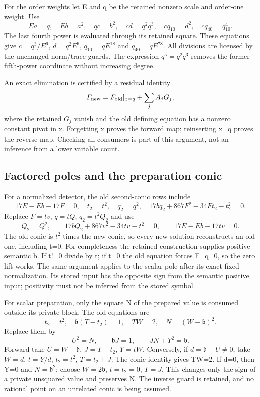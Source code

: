 For the order weights let E and q be the retained nonzero scale and
order-one weight. Use
\[
 Ea=q,\quad Eb=a^2,\quad qc=b^2,\quad cd=q^2q^3,
 \quad cq_{10}=d^2,\quad cq_{40}=q_{10}^4.
\]
The last fourth power is evaluated through its retained square.
These equations give $c=q^3/E^6$, $d=q^2E^6$,
$q_{10}=qE^{18}$ and $q_{40}=qE^{78}$. All divisions are licensed by
the unchanged norm/trace guards. The expression $q^5=q^2q^3$
removes the former fifth-power coordinate without increasing degree.

An exact elimination is certified by a residual identity
\[
 F_{\rm new}=F_{\rm old}|_{x=q}
              +\sum_j A_jG_j,
\]
where the retained $G_j$ vanish and the old defining equation has a
nonzero constant pivot in x. Forgetting x proves the forward map;
reinserting x=q proves the reverse map. Checking all consumers is
part of this argument, not an inference from a lower variable count.

\subsection{Factored poles and the preparation conic}
For a normalized detector, the old second-conic rows include
\[
 17E-Eb-17F=0,\quad t_2=t^2,\quad q_2=q^2,\quad
 17bq_2+867F^2-34Ft_2-t_2^2=0.
\]
Replace $F=t v$, $q=t Q$, $q_2=t^2Q_2$ and use
\[
 Q_2=Q^2,\qquad17bQ_2+867v^2-34tv-t^2=0,
 \qquad17E-Eb-17tv=0.
\]
The old conic is $t^2$ times the new conic, so every new solution
reconstructs an old one, including t=0. For completeness the retained
construction supplies positive semantic b. If t!=0 divide by t;
if t=0 the old equation forces F=q=0, so the zero lift works.
The same argument applies to the scalar pole after its exact fixed
normalization. Its stored input has the opposite sign from the semantic
positive input; positivity must not be inferred from the stored symbol.

For scalar preparation, only the square N of the prepared value is
consumed outside its private block. The old equations are
\[
 t_2=t^2,\quad\mathfrak b(T-t_2)=1,\quad TW=2,
 \quad N=(W-\mathfrak b)^2.
\]
Replace them by
\[
 U^2=N,\qquad \mathfrak bJ=1,\qquad JN+Y^2=\mathfrak b.
\]
Forward take $U=W-\mathfrak b$, $J=T-t_2$, $Y=tW$. Conversely, if
$d=\mathfrak b+U\ne0$, take $W=d$, $t=Y/d$, $t_2=t^2$, $T=t_2+J$.
The conic identity gives TW=2. If d=0, then Y=0 and
$N=\mathfrak b^2$; choose $W=2\mathfrak b$, $t=t_2=0$, $T=J$.
This changes only the sign of a private unsquared value and preserves N.
The inverse guard is retained, and no rational point on an unrelated
conic is being assumed.


